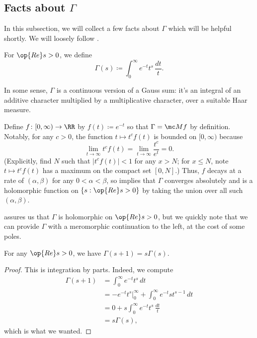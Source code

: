 \documentclass[../notes.tex]{subfiles}
\begin{document}
\subsection{Facts about \texorpdfstring{$\Gamma$}{ Gamma}}
In this subsection, we will collect a few facts about $\Gamma$ which will be helpful shortly. We will loosely follow \cite[Section 1]{tao-gamma-function}.
\begin{definition}
	For $\op{Re}s>0$, we define
	\[\Gamma(s)\coloneqq\int_0^\infty e^{-t}t^s\,\frac{dt}t.\]
\end{definition}
\begin{remark} \label{rem:gamma-is-gauss-sum}
	In some sense, $\Gamma$ is a continuous version of a Gauss sum: it's an integral of an additive character multiplied by a multiplicative character, over a suitable Haar measure.
\end{remark}
\begin{remark} \label{rem:gamma-is-holo}
	Define $f\colon[0,\infty)\to\RR$ by $f(t)\coloneqq e^{-t}$ so that $\Gamma=\mc Mf$ by definition. Notably, for any $c>0$, the function $t\mapsto t^cf(t)$ is bounded on $[0,\infty)$ because
	\[\lim_{t\to\infty}t^cf(t)=\lim_{t\to\infty}\frac{t^c}{e^t}=0.\]
	(Explicitly, find $N$ such that $\left|t^cf(t)\right|<1$ for any $x>N$; for $x\le N$, note $t\mapsto t^cf(t)$ has a maximum on the compact set $[0,N]$.) Thus, $f$ decays at a rate of $(\alpha,\beta)$ for any $0<\alpha<\beta$, so  implies that $\Gamma$ converges absolutely and is a holomorphic function on $\{s:\op{Re}s>0\}$ by taking the union over all such $(\alpha,\beta)$.
\end{remark}
 assures us that $\Gamma$ is holomorphic on $\op{Re}s>0$, but we quickly note that we can provide $\Gamma$ with a meromorphic continuation to the left, at the cost of some poles.
\begin{lemma} \label{lem:ind-continue-gamma}
	For any $\op{Re}s>0$, we have $\Gamma(s+1)=s\Gamma(s)$.
\end{lemma}
\begin{proof}
	This is integration by parts. Indeed, we compute
	\begin{align*}
		\Gamma(s+1) &= \int_0^\infty e^{-t}t^{s}\,dt \\
		&= -e^{-t}t^s\bigg|_0^\infty+\int_0^\infty e^{-t}st^{s-1}\,dt \\
		&= 0+s\int_0^\infty e^{-t}t^s\,\frac{dt}t \\
		&= s\Gamma(s),
	\end{align*}
	which is what we wanted.
\end{proof}
\end{document}
